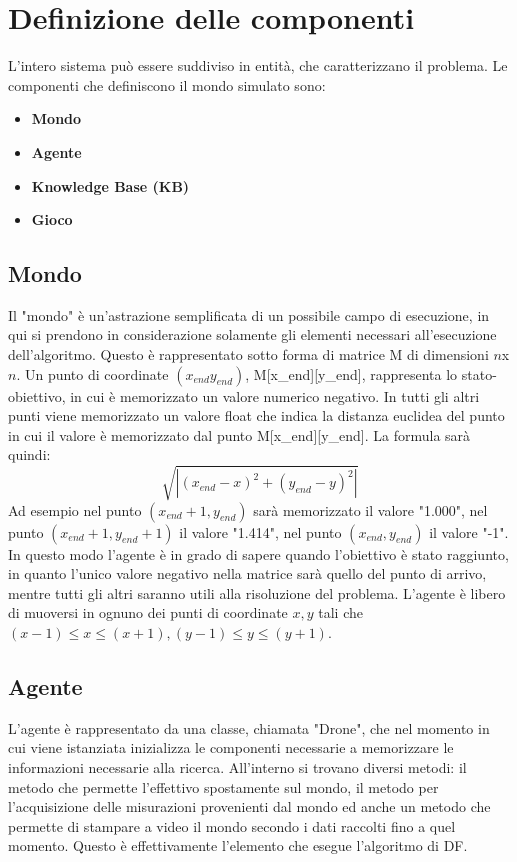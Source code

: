 \section{Definizione delle componenti}
L'intero sistema può essere suddiviso in entità, che caratterizzano il problema. 
Le componenti che definiscono il mondo simulato sono:
\begin{itemize}
\item \textbf{Mondo}

\item \textbf{Agente}

\item \textbf{Knowledge Base (KB)}

\item \textbf{Gioco} 	
\end{itemize}

\subsection{Mondo}
Il "mondo" è un'astrazione semplificata di un possibile campo di esecuzione, in qui si prendono in considerazione solamente gli elementi necessari all'esecuzione dell'algoritmo. Questo è rappresentato sotto forma di matrice M di dimensioni $n$x$n$. Un punto di coordinate $(x_{end} y_{end})$, M[x_{end}][y_{end}], rappresenta lo stato-obiettivo, in cui è memorizzato un valore numerico negativo. In tutti gli altri punti viene memorizzato un valore float che indica la distanza euclidea del punto in cui il valore è memorizzato dal punto M[x_{end}][y_{end}]. La formula sarà quindi:
$$\sqrt{|(x_{end} - x)^2 + (y_{end} - y)^2|}$$
Ad esempio nel punto $(x_{end}+1, y_{end})$ sarà memorizzato il valore "1.000", nel punto $(x_{end}+1, y_{end}+1)$ il valore "1.414", nel punto $(x_{end}, y_{end})$ il valore "-1". In questo modo l'agente è in grado di sapere quando l'obiettivo è stato raggiunto, in quanto l'unico valore negativo nella matrice sarà quello del punto di arrivo, mentre tutti gli altri saranno utili alla risoluzione del problema.
L'agente è libero di muoversi in ognuno dei punti di coordinate $ x, y $ tali che $ (x-1) \le x \le (x+1), (y-1) \le y \le (y+1) $.

\subsection{Agente}
L'agente è rappresentato da una classe, chiamata "Drone", che nel momento in cui viene istanziata inizializza le componenti necessarie a memorizzare le informazioni necessarie alla ricerca. All'interno si trovano diversi metodi: il metodo che permette l'effettivo spostamente sul mondo, il metodo per l'acquisizione delle misurazioni provenienti dal mondo ed anche un metodo che permette di stampare a video il mondo secondo i dati raccolti fino a quel momento. Questo è effettivamente l'elemento che esegue l'algoritmo di DF.

